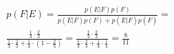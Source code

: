 \item
  \[\begin{array}{l}
  p(F|E) = \frac{{p(E|F)p(F)}}{{p(E|F)p(F) + p(E|\bar F)p(\bar F)}} = \\
  \frac{{\frac{1}{3} \cdot \frac{2}{3}}}{{\frac{1}{3} \cdot \frac{2}{3} + \frac{1}{4} \cdot \left( {1 - \frac{2}{3}} \right)}} = \frac{{\frac{1}{3} \cdot \frac{2}{3}}}{{\frac{1}{3} \cdot \frac{2}{3} + \frac{1}{4} \cdot \frac{1}{3}}} = \frac{8}{{11}}
  \end{array}\]
